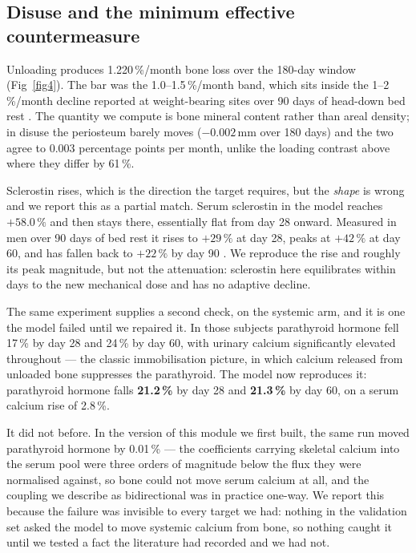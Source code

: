 \documentclass[10pt,letterpaper]{article}
\begin{document}
\subsection*{Disuse and the minimum effective countermeasure}

Unloading produces 1.220\,\%/month bone loss over the 180-day window
(Fig~\ref{fig4}). The bar was the 1.0--1.5\,\%/month band, which sits inside
the 1--2\,\%/month decline reported at weight-bearing sites over 90 days of
head-down bed rest \cite{spatz2012}. The quantity we compute is bone mineral
content rather than areal density; in disuse the periosteum barely moves
($-0.002$\,mm over 180 days) and the two agree to 0.003 percentage points per
month, unlike the loading contrast above where they differ by 61\,\%.

Sclerostin rises, which is the direction the target requires, but the
\emph{shape} is wrong and we report this as a partial match. Serum sclerostin
in the model reaches $+58.0\,\%$ and then stays there, essentially flat from
day 28 onward. Measured in men over 90 days of bed rest it rises to
$+29\,\%$ at day 28, peaks at $+42\,\%$ at day 60, and has fallen back to
$+22\,\%$ by day 90 \cite{spatz2012}. We reproduce the rise and roughly its
peak magnitude, but not the attenuation: sclerostin here equilibrates within
days to the new mechanical dose and has no adaptive decline.

The same experiment supplies a second check, on the systemic arm, and it is one
the model failed until we repaired it. In those subjects parathyroid hormone
fell 17\,\% by day 28 and 24\,\% by day 60, with urinary calcium
significantly elevated throughout \cite{spatz2012} --- the classic
immobilisation picture, in which calcium released from unloaded bone suppresses
the parathyroid. The model now reproduces it: parathyroid hormone falls
\textbf{21.2\,\%} by day 28 and \textbf{21.3\,\%} by day 60, on a serum
calcium rise of 2.8\,\%.

It did not before. In the version of this module we first built, the same run
moved parathyroid hormone by 0.01\,\% --- the coefficients carrying skeletal
calcium into the serum pool were three orders of magnitude below the flux they
were normalised against, so bone could not move serum calcium at all, and the
coupling we describe as bidirectional was in practice one-way. We report this
because the failure was invisible to every target we had: nothing in the
validation set asked the model to move systemic calcium from bone, so nothing
caught it until we tested a fact the literature had recorded and we had not.
\end{document}
